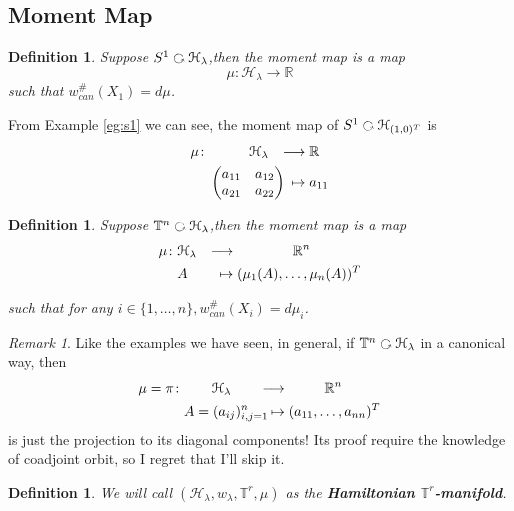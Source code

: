 \documentclass[11pt]{amsart}
\numberwithin{equation}{section}
\theoremstyle{plain}
\newtheorem{defn}[theorem]{Definition}
\theoremstyle{plain}
\numberwithin{equation}{section}
\theoremstyle{remark}
\newtheorem{remark}[theorem]{Remark}
\begin{document}
\subsection{Moment Map}
\begin{defn}
	Suppose $S^1 \text{ \rotatebox[origin=c]{270}{$\circlearrowleft$} } \mathcal{H}_\lambda$,then the moment map is a map
	$$\mu:\mathcal{H}_\lambda \longrightarrow \mathbb{R}$$
	such that $w_{can}^\#(X_1)=d\mu$.
\end{defn}
From Example \ref{eg:s1} we can see, the moment map of
$S^1 \text{ \rotatebox[origin=c]{270}{$\circlearrowleft$} } \mathcal{H}_{(1,0)^T}$ is
	\begin{equation*}
\begin{aligned}	
\mu \colon &\hspace{1.0cm} \mathcal{H}_\lambda &\longrightarrow &\;\mathbb{R} \\
&\begin{pmatrix}
a_{11} & a_{12} \\
a_{21} & a_{22}
\end{pmatrix}\hspace{-0.5cm} &\mapsto &\;a_{11}
\end{aligned}
\end{equation*}

\begin{defn}
	Suppose $\mathbb{T}^n \text{ \rotatebox[origin=c]{270}{$\circlearrowleft$} } \mathcal{H}_\lambda$,then the moment map is a map
		\begin{equation*}
	\begin{aligned}	
	\mu\colon &\mathcal{H}_\lambda &\longrightarrow &\hspace{1.5cm}\mathbb{R}^n \\
	&A \hspace{-0.5cm} &\mapsto &\;(\mu_1(A),\ldots, \mu_n(A))^T
	\end{aligned}
	\end{equation*}

such that for any $ i \in \{1,\ldots,n\},  w_{can}^\#(X_i)=d\mu_i$.
\end{defn}
\begin{remark}
	Like the examples we have seen, in general,
	if $\mathbb{T}^n \text{ \rotatebox[origin=c]{270}{$\circlearrowleft$} } \mathcal{H}_\lambda$ in a canonical way, then
		\begin{equation*}
		\begin{aligned}	
		\mu=\pi \colon &\hspace{0.7cm}\mathcal{H}_\lambda &\longrightarrow &\hspace{1.0cm}\mathbb{R}^n \\
		&A=(a_{ij})_{i,j=1}^n \hspace{-0.5cm} &\mapsto &\; (a_{11}, \ldots, a_{nn})^T
		\end{aligned}
		\end{equation*}
	is just the projection to its diagonal components! 
	Its proof require the knowledge of coadjoint orbit, so I  regret that I'll skip it.
\end{remark}
\begin{defn}
	We will call $(\mathcal{H}_\lambda,w_\lambda, \mathbb{T}^r, \mu) $ as the \textbf{Hamiltonian $\mathbb{T}^r$-manifold}.
\end{defn}
\end{document}
